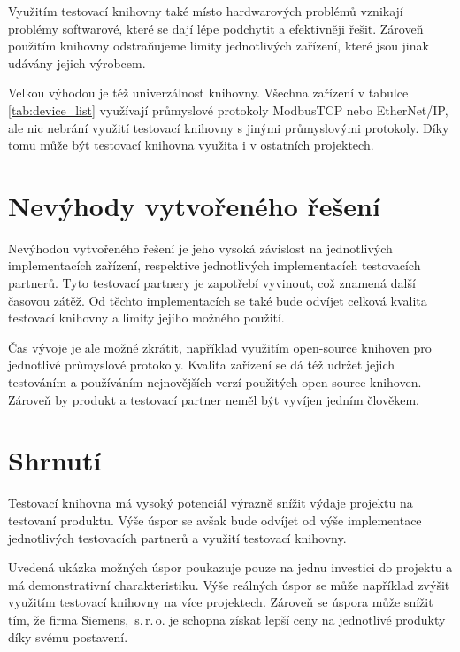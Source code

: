 Využitím testovací knihovny také místo hardwarových problémů vznikají problémy softwarové, které se dají lépe podchytit a efektivněji řešit. Zároveň použitím knihovny odstraňujeme limity jednotlivých zařízení, které jsou jinak udávány jejich výrobcem.

Velkou výhodou je též univerzálnost knihovny. Všechna zařízení v tabulce \ref{tab:device_list} využívají průmyslové protokoly ModbusTCP nebo EtherNet/IP, ale nic nebrání využití testovací knihovny s jinými průmyslovými protokoly. Díky tomu může být testovací knihovna využita i v ostatních projektech. 

\section{Nevýhody vytvořeného řešení}
Nevýhodou vytvořeného řešení je jeho vysoká závislost na jednotlivých implementacích zařízení, respektive jednotlivých implementacích testovacích partnerů. Tyto testovací partnery je zapotřebí vyvinout, což znamená další časovou zátěž. Od těchto implementacích se také bude odvíjet celková kvalita testovací knihovny a limity jejího možného použití.

Čas vývoje je ale možné zkrátit, například využitím open-source knihoven pro jednotlivé průmyslové protokoly. Kvalita zařízení se dá též udržet jejich testováním a používáním nejnovějších verzí použitých open-source knihoven. Zároveň by produkt a testovací partner neměl být vyvíjen jedním člověkem.


\section{Shrnutí}
Testovací knihovna má vysoký potenciál výrazně snížit výdaje projektu na testovaní produktu. 
Výše úspor se avšak bude odvíjet od výše implementace jednotlivých testovacích partnerů a využití testovací knihovny.

Uvedená ukázka možných úspor poukazuje pouze na jednu investici do projektu a má demonstrativní charakteristiku. Výše reálných úspor se může například zvýšit využitím testovací knihovny na více projektech. Zároveň se úspora může snížit tím, že firma Siemens,~s.\,{}r.\,{}o. je schopna získat lepší ceny na jednotlivé produkty díky svému postavení.


